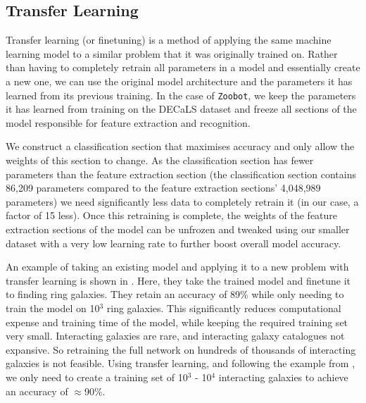 \subsection{Transfer Learning}\label{trans_learn}
\noindent Transfer learning (or finetuning) is a method of applying the same machine learning model to a similar problem that it was originally trained on. Rather than having to completely retrain all parameters in a model and essentially create a new one, we can use the original model architecture and the parameters it has learned from its previous training. In the case of \texttt{Zoobot}, we keep the parameters it has learned from training on the DECaLS dataset and freeze all sections of the model responsible for feature extraction and recognition. 

We construct a classification section that maximises accuracy and only allow the weights of this section to change. As the classification section has fewer parameters than the feature extraction section (the classification section contains 86,209 parameters compared to the feature extraction sections' 4,048,989 parameters) we need significantly less data to completely retrain it (in our case, a factor of 15 less). Once this retraining is complete, the weights of the feature extraction sections of the model can be unfrozen and tweaked using our smaller dataset with a very low learning rate to further boost overall model accuracy.

An example of taking an existing model and applying it to a new problem with transfer learning is shown in \citet{2022MNRAS.513.1581W}. Here, they take the trained model and finetune it to finding ring galaxies. They retain an accuracy of 89\% while only needing to train the model on 10$^{3}$ ring galaxies. This significantly reduces computational expense and training time of the model, while keeping the required training set very small. Interacting galaxies are rare, and interacting galaxy catalogues not expansive. So retraining the full network on hundreds of thousands of interacting galaxies is not feasible. Using transfer learning, and following the example from \citet{2022MNRAS.513.1581W}, we only need to create a training set of 10$^{3}$ - 10$^{4}$ interacting galaxies to achieve an accuracy of $\approx$90\%. 



